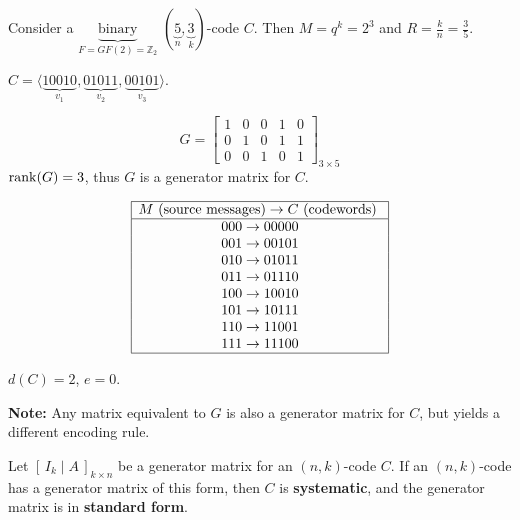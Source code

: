 
\begin{exbox}
    \begin{example}
        Consider a $ \underbrace{\text{binary}}_{F=GF(2)=\mathbb{Z}_2} $
        $ (\underbrace{5}_{n},\underbrace{3}_{k}) $-code $ C $. Then
        $ M=q^k=2^3 $ and $ R=\frac{k}{n} =\frac{3}{5} $.

        $ C=\langle \underbrace{10010}_{v_1},\underbrace{01011}_{v_2},\underbrace{00101}_{v_3} \rangle$.

        \[ G=
            \left[\begin{array}{ccc|cc}
                    1 & 0 & 0 & 1 & 0 \\
                    0 & 1 & 0 & 1 & 1 \\
                    0 & 0 & 1 & 0 & 1
                \end{array}\right]_{3\times 5} \]
        $ \operatorname{rank}(G)=3 $, thus $ G $ is a generator matrix for $ C $.

        \begin{center}
            \[
                \begin{array}{|c|}
                    \hline
                    M\text{ (source messages)} \rightarrow C\text{ (codewords) }       \\
                    \hline
                    000 \rightarrow 00000 \\
                    001 \rightarrow 00101 \\
                    010 \rightarrow 01011 \\
                    011 \rightarrow 01110 \\
                    100 \rightarrow 10010 \\
                    101 \rightarrow 10111 \\
                    110 \rightarrow 11001 \\
                    111 \rightarrow 11100 \\
                    \hline
                \end{array}
            \]
        \end{center}
        $ d(C)=2 $, $ e=0 $.
    \end{example}
\end{exbox}

\textbf{Note:} Any matrix equivalent to $ G $ is also a generator matrix
for $ C $, but yields a different encoding rule.

\begin{defbox}
    \begin{definition}
        Let $ \left[\, I_k\mid A \,\right]_{k\times n} $ be a generator matrix
        for an $ (n,k) $-code $ C $. If an $ (n,k) $-code has a generator
        matrix of this form, then $ C $ is \textbf{systematic}, and the generator
        matrix is in \textbf{standard form}.
    \end{definition} \end{defbox}

